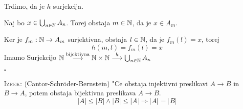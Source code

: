Trdimo, da je $h$ surjekcija.

Naj bo $x \in \bigcup_{n \in \mathbb{N}} A_n$. Torej obstaja $m \in \mathbb{N}$, da je $x \in A_m$.

Ker je $f_m: \mathbb{N} \to A_m$ surjektivna, obstaja $l \in \mathbb{N}$, da je $f_m(l) = x$, torej
\begin{equation*}
h(m, l) = f_m(l) = x
\end{equation*}
Imamo Surjekcijo $\mathbb{N} \stackrel{\text{bijektivna}}{\longrightarrow} \mathbb{N} \times \mathbb{N} \stackrel{h}{\longrightarrow} \bigcup_{n \in \mathbb{N}} A_n$

\hfill $\square$

\textsc{Izrek:} (Cantor-Schr\"oder-Bernstein) "Ce obstaja injektivni preslikavi $A \to B$ in $B \to A$, potem obstaja bijektivna preslikava $A \to B$.
\begin{equation*}
|A| \leq |B| \land |B| \leq |A| \Rightarrow |A| = |B|
\end{equation*}
